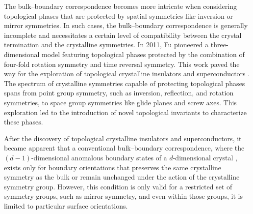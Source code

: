 The bulk–boundary correspondence becomes more intricate when considering topological phases that are protected by spatial symmetries like inversion or mirror symmetries. In such cases, the bulk–boundary correspondence is generally incomplete and necessitates a certain level of compatibility between the crystal termination and the crystalline symmetries. In 2011, Fu pioneered a three-dimensional model featuring topological phases protected by the combination of four-fold rotation symmetry and time reversal symmetry. This work paved the way for the exploration of topological crystalline insulators and superconductors \cite{fu2011topological}. The spectrum of crystalline symmetries capable of protecting topological phases spans from point group symmetry, such as inversion\cite{hughes2011inversion,lu2014inversion}, reflection\cite{hsieh2012topological, chiu2013classification}, and rotation symmetries, to space group symmetries like glide planes and screw axes\cite{po2017symmetry,slager2013space,kruthoff2017topological}. This exploration led to the introduction of novel topological invariants to characterize these phases.


After the discovery of topological crystalline insulators and superconductors\cite{ando2015topological, fu2011topological, hsieh2012topological, dziawa2012topological, liu2021bulk}, it became apparent that a conventional bulk–boundary correspondence, where the $(d-1)$-dimensional anomalous boundary states of a $d$-dimensional crystal , exists only for boundary orientations that preserves the same  crystalline symmetry as the bulk or remain unchanged under the action of the crystalline symmetry group. However, this condition is only valid for a restricted set of symmetry groups, such as mirror symmetry\cite{ando2015topological}, and even within those groups, it is limited to particular surface orientations.


